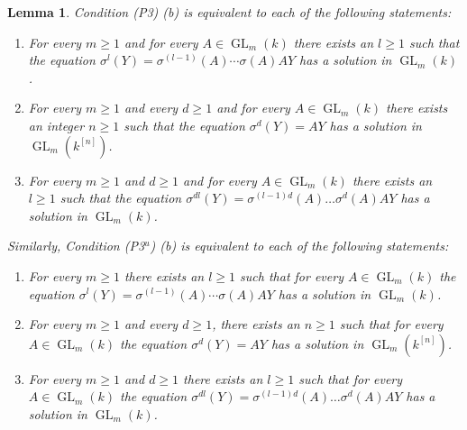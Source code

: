 \documentclass[oneside,reqno]{amsart}
\newtheorem{lemma}[theo]{Lemma}
\theoremstyle{definition}
\newcommand{\Gl}{\operatorname{GL}}
\newcommand{\s}{\sigma}
\newcommand{\kn}{k^{[n]}}
\newcommand{\pt}{{\rm{(P3$^u$)}}}
\newcommand{\ptweak}{{\rm{(P3)}}}
\begin{document}
\begin{lemma} \label{lemma: on pt (b) was remark}
Condition \ptweak{} (b) is equivalent to each of the following statements:
	
	\begin{enumerate}
		\item[\ptweak{} \rm{(b')}] For every $m\geq 1$ and for every $A\in\Gl_m(k)$ there exists an $l\geq 1$ such that  the equation $\s^{l}(Y)=\s^{(l-1)}(A)\cdots\s(A)AY$ has a solution in $\Gl_m(k)$. 	
		\item[\ptweak{}  \rm{(b$_d$)}]  For every $m\geq 1$ and every $d\geq 1$ and for every $A\in\Gl_m(k)$  there exists an integer $n\geq 1$ such that the equation $\s^d(Y)=AY$ has a solution in $\Gl_m(\kn)$. 		
		\item[\ptweak{} \rm{(b$_d$')}] For every $m\geq 1$ and $d\geq 1$ and for every $A\in\Gl_m(k)$  there exists an $l\geq 1$ such that the equation $\s^{dl}(Y)=\s^{(l-1)d}(A)\ldots\s^d(A)AY$ has a solution in $\Gl_m(k)$. 
	\end{enumerate}	
    
	Similarly, Condition \pt{} \rm{(b)} is equivalent to each of the following statements:
	
	\begin{enumerate}
		\item[ \pt{} (b')] For every $m\geq 1$ there exists an $l\geq 1$ such that for every $A\in\Gl_m(k)$ the equation $\s^{l}(Y)=\s^{(l-1)}(A)\cdots\s(A)AY$ has a solution in $\Gl_m(k)$. 	
		\item[ \pt{}  (b$_d$)]  For every $m\geq 1$ and every $d\geq 1$, there exists an $n\geq 1$ such that for every $A\in\Gl_m(k)$ the equation $\s^d(Y)=AY$ has a solution in $\Gl_m(\kn)$. 
		
		\item[ \pt{} (b$_d$')] For every $m\geq 1$ and $d\geq 1$ there exists an $l\geq 1$ such that for every $A\in\Gl_m(k)$ the equation $\s^{dl}(Y)=\s^{(l-1)d}(A)\ldots\s^d(A)AY$ has a solution in $\Gl_m(k)$. 
	\end{enumerate}	
	
\end{lemma}
\end{document}
